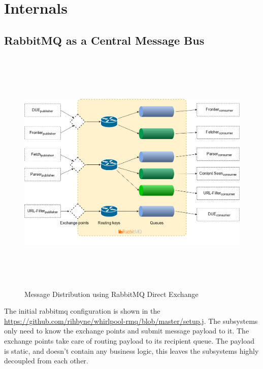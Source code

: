 \section{Internals}\label{internals}
\subsection{RabbitMQ as a Central Message Bus}
\begin{figure}[h!]
  \centering
  \includegraphics[width=20cm,height=12cm,keepaspectratio]{../media/crawler/rmq-broker.png}
  \caption{Message Distribution using RabbitMQ Direct Exchange}
  \label{fig:rmq}
\end{figure}

\noindent
The initial rabbitmq configuration is shown in the \url{https://github.com/rihbyne/whirlpool-rmq/blob/master/setup.j}. The subsystems only need to know the exchange points and submit message payload to it. The exchange points take care of routing payload to its recipient queue. The payload is static, and doesn't contain any business logic, this leaves the subsystems highly decoupled from each other.
\pagebreak

